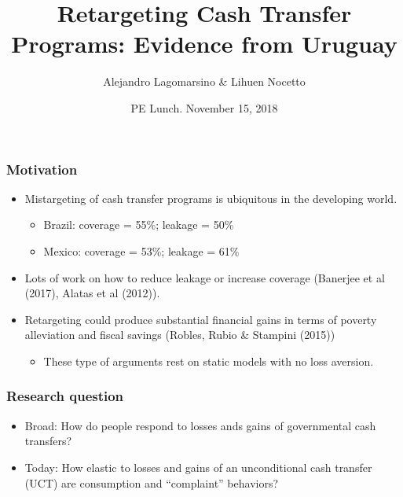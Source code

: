 \documentclass{beamer}
\title[Retargeting Cash Transfer Programs] %
{Retargeting Cash Transfer Programs: Evidence from Uruguay}
\author[Alejandro Lagomarsino] %
{Alejandro Lagomarsino \& Lihuen Nocetto\inst{*} }
\institute[Harvard University] %
{
	\inst{*}%
	Harvard University\\
	Pontifical Catholic University of Chile
}
\date[November. 2018] %
{PE Lunch. November 15, 2018}
\begin{document}
	\setlength{\parindent}{10pt}
	
	\frame{\titlepage}

\begin{frame}
\frametitle{Motivation}
\begin{itemize}
	\item Mistargeting of cash transfer programs is ubiquitous in the developing world.
	\begin{itemize}
		\item Brazil: coverage = 55\%; leakage = 50\%
		\item Mexico: coverage = 53\%; leakage = 61\%
	\end{itemize}
	\item Lots of work on how to reduce leakage or increase coverage (Banerjee et al (2017), Alatas et al (2012)). 
	\item Retargeting could produce substantial financial gains in terms of poverty alleviation and fiscal savings (Robles, Rubio \& Stampini (2015))
	\begin{itemize}
		\item These type of arguments rest on static models with no loss aversion.
	\end{itemize}
\end{itemize}
\end{frame}

\begin{frame}
\frametitle{Research question}
\begin{itemize}
	\item Broad: How do people respond to losses ands gains of governmental cash transfers?
	\item Today: How elastic to losses and gains of an unconditional cash transfer (UCT) are consumption and ``complaint'' behaviors?

\end{itemize}
\end{frame}
\end{document}
